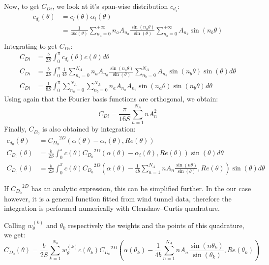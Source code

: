 \documentclass[letterpaper,12pt]{article}
\begin{document}
\noindent Now, to get $C_{Di}$, we look at it's span-wise distribution $c_{d_i}$:
\begin{align*}
	c_{d_i} (\theta) &= c_l (\theta) \alpha_i (\theta) \\
					&=  \frac{1}{4bc(\theta)}\sum_{n_a=0}^{+\infty} n_a A_{n_a} \frac{ \sin(n_a\theta) }{\sin(\theta)} \sum_{n_b=0}^{+\infty} A_{n_b} \sin(n_b\theta) \\
\end{align*}
Integrating to get $C_{Di}$:
\begin{align}
	C_{Di} &= \frac b {2S} \int_{0}^{\pi} c_{d_i}(\theta) c(\theta) d\theta \nonumber\\
	C_{Di} &= \frac b {2S} \int_{0}^{\pi} \frac{1}{4b}
		\sum_{n_a=0}^{N_A} n_a A_{n_a} \frac{ \sin(n_a\theta) }{\sin(\theta)} 
		\sum_{n_b=0}^{N_A} A_{n_b} \sin(n_b\theta) \sin(\theta) 
		d\theta  \nonumber \\ 
	C_{Di} &= \frac 1 {8S} \int_{0}^{\pi} \sum_{n_a=0}^{N_A} \sum_{n_b=0}^{N_A} n_a A_{n_a}A_{n_b} \sin(n_a\theta) \sin(n_b\theta) d\theta
\end{align}
Using again that the Fourier basis functions are orthogonal, we obtain:
%
\begin{equation}
	\label{eq:cdi}
	C_{Di} = \frac {\pi}{16S} \sum_{n=1}^{N_A} n A_{n}^2
\end{equation}
%
Finally, $C_{D_0}$ is also obtained by integration:
%
\begin{align*}
	c_{d_0}(\theta) &= {C_{D_0}}^{2D}\left( \alpha(\theta) - \alpha_i(\theta), Re(\theta)\right) \\
	C_{D_0}(\theta) &= \frac b {2S} \int_{0}^{\pi} c(\theta) {C_{D_0}}^{2D}\left( \alpha(\theta) - \alpha_i(\theta), Re(\theta)\right) \sin(\theta) d\theta \\
	C_{D_0}(\theta) &= \frac b {2S} \int_{0}^{\pi} c(\theta) {C_{D_0}}^{2D}\left( \alpha(\theta) - \frac {1}{4b}  \sum_{n=1}^{N_A} n A_n \frac{ \sin(n\theta) }{\sin(\theta)} , Re(\theta)\right) \sin(\theta) d\theta
\end{align*}

If ${C_{D_0}}^{2D}$ has an analytic expression, this can be simplified further.
In the our case however, it is a general function fitted from wind tunnel data, 
therefore the integration is performed numerically with Clenshaw–Curtis quadrature. 

Calling $w_{\theta}^{(k)}$ and $\theta_k$ respectively the weights and the points of this quadrature, we get:
\begin{equation}
	\label{eq:cd0}
	C_{D_0}(\theta) = \frac b {2S} \sum_{k=1}^{N_{\theta}} w_{\theta}^{(k)} c(\theta_k) {C_{D_0}}^{2D}\left( \alpha(\theta_k) - \frac {1}{4b} \sum_{n=1}^{N_A} n A_n \frac{ \sin(n\theta_k) }{\sin(\theta_k)} , Re(\theta_k)\right)
\end{equation}
\end{document}
